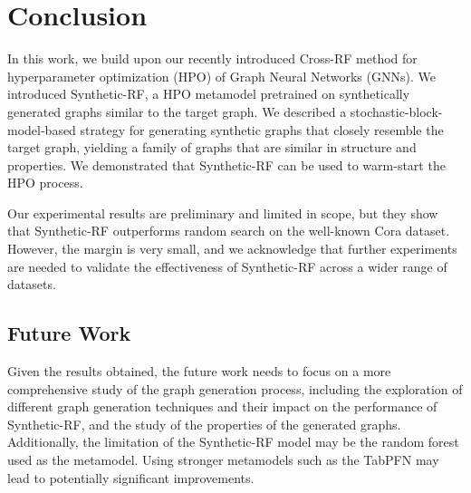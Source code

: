 \section{Conclusion}
\label{sec:conclusion}

In this work, we build upon our recently introduced Cross-RF method for hyperparameter optimization (HPO) of Graph Neural Networks (GNNs). We introduced Synthetic-RF, a HPO metamodel pretrained on synthetically generated graphs similar to the target graph. We described a stochastic-block-model-based strategy for generating synthetic graphs that closely resemble the target graph, yielding a family of graphs that are similar in structure and properties. We demonstrated that Synthetic-RF can be used to warm-start the HPO process.

Our experimental results are preliminary and limited in scope, but they show that Synthetic-RF outperforms random search on the well-known Cora dataset. However, the margin is very small, and we acknowledge that further experiments are needed to validate the effectiveness of Synthetic-RF across a wider range of datasets.

\subsection{Future Work}
Given the results obtained, the future work needs to focus on a more comprehensive study of the graph generation process, including the exploration of different graph generation techniques and their impact on the performance of Synthetic-RF, and the study of the properties of the generated graphs. Additionally, the limitation of the Synthetic-RF model may be the random forest used as the metamodel. Using stronger metamodels such as the TabPFN may lead to potentially significant improvements.
